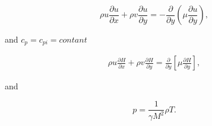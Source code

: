 \begin{equation} 
\rho u\frac{\partial u}{\partial x}+
\rho v\frac{\partial u}{\partial y}=-
\frac{\partial}{\partial y}
\left(\mu\frac{\partial u}{\partial y}\right)
,
\end{equation} 

and $c_p=c_{pi}=contant$

\begin{equation*} 
\begin{split} 
\rho u \frac{\partial H}{\partial x}
+
\rho v \frac{\partial H}{\partial y}
=
\frac{\partial}{\partial y}
    \left[
        \mu
        \frac{\partial H}{\partial y}
    \right]
    ,
\end{split} 
\end{equation*} 

and 

\begin{equation} 
p=\frac{1}{\gamma M^2} \rho T
.
\end{equation} 


